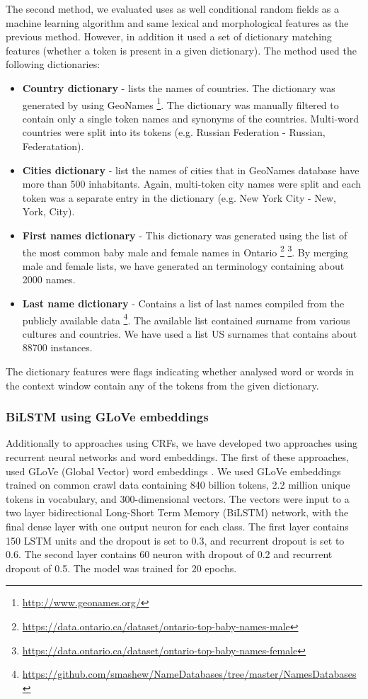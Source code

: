 \documentclass[a4paper,twoside]{article}
\begin{document}
The second method, we evaluated uses as well conditional random fields as a machine learning algorithm and same lexical and morphological features as the previous method. However, in addition it used a set of dictionary matching features (whether a token is present in a given dictionary). The method used the following dictionaries: 
\begin{itemize}
    \item \textbf{Country dictionary} - lists the names of countries. The dictionary was generated by using GeoNames \footnote{\url{http://www.geonames.org/}}. The dictionary was manually filtered to contain only a single token names and synonyms of the countries. Multi-word countries were split into its tokens (e.g. Russian Federation - Russian, Federatation).
    \item \textbf{Cities dictionary} - list the names of cities that in GeoNames database have more than 500 inhabitants. Again, multi-token city names were split and each token was a separate entry in the dictionary (e.g. New York City - New, York, City). 
    \item \textbf{First names dictionary} - This dictionary was generated using the list of the most common baby male and female names in Ontario \footnote{\url{https://data.ontario.ca/dataset/ontario-top-baby-names-male}} \footnote{\url{https://data.ontario.ca/dataset/ontario-top-baby-names-female}}. By merging male and female lists, we have generated an terminology containing about 2000 names. 
    \item \textbf{Last name dictionary} - Contains a list of last names compiled from the publicly available data \footnote{\url{https://github.com/smashew/NameDatabases/tree/master/NamesDatabases}}. The available list contained surname from various cultures and countries. We have used a list US surnames that contains about 88700 instances. 
\end{itemize}

The dictionary features were flags indicating whether analysed word or words in the context window contain any of the tokens from the given dictionary. 

\subsubsection{BiLSTM using GLoVe embeddings}

Additionally to approaches using CRFs, we have developed two approaches using recurrent neural networks and word embeddings. The first of these approaches, used GLoVe (Global Vector) word embeddings \cite{pennington2014glove}. We used GLoVe embeddings trained on common crawl data containing 840 billion tokens, 2.2 million unique tokens in vocabulary, and 300-dimensional vectors. The vectors were input to a two layer bidirectional Long-Short Term Memory (BiLSTM) network, with the final dense layer with one output neuron for each class.  The first layer contains 150 LSTM units and the dropout is set to 0.3, and recurrent dropout is set to 0.6. The second layer contains 60 neuron with dropout of 0.2 and recurrent dropout of 0.5. The model was trained for 20 epochs.
\end{document}
